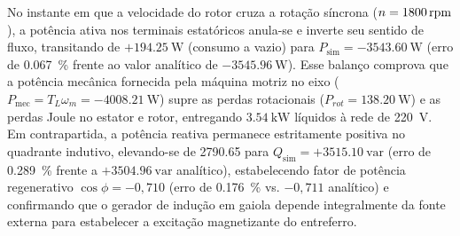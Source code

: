 No instante em que a velocidade do rotor cruza a rotação síncrona ($n = \SI{1800}{\mathrm{rpm}}$), a potência ativa nos terminais estatóricos anula-se e inverte seu sentido de fluxo, transitando de $+\SI{194,25}{\watt}$ (consumo a vazio) para $P_{\text{sim}} = -\SI{3543,60}{\watt}$ (erro de \SI{0,067}{\percent} frente ao valor analítico de $-\SI{3545,96}{\watt}$). Esse balanço comprova que a potência mecânica fornecida pela máquina motriz no eixo ($P_{\text{mec}} = T_L \omega_m = -\SI{4008,21}{\watt}$) supre as perdas rotacionais ($P_{rot} = \SI{138,20}{\watt}$) e as perdas Joule no estator e rotor, entregando $\SI{3,54}{\kilo\watt}$ líquidos à rede de \SI{220}{\volt}. Em contrapartida, a potência reativa permanece estritamente positiva no quadrante indutivo, elevando-se de \SI{2790,65}{} para $Q_{\text{sim}} = +\SI{3515,10}{\text{var}}$ (erro de \SI{0,289}{\percent} frente a $+\SI{3504,96}{\text{var}}$ analítico), estabelecendo fator de potência regenerativo $\cos\phi = -0{,}710$ (erro de \SI{0,176}{\percent} vs. $-0{,}711$ analítico) e confirmando que o gerador de indução em gaiola depende integralmente da fonte externa para estabelecer a excitação magnetizante do entreferro.
